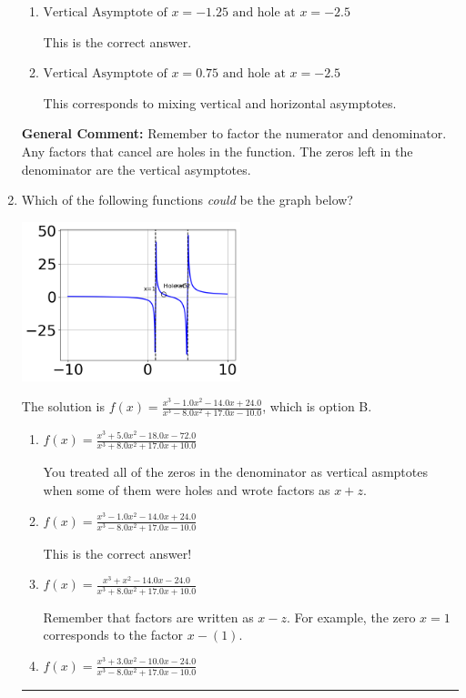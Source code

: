 \documentclass{extbook}[14pt]
\newcommand{\litem}[1]{\item #1

\rule{\textwidth}{0.4pt}}
\begin{document}
\begin{enumerate}
{\begin{enumerate}[label=\Alph*.]
This corresponds to considering where the denominator is equal to 0 as holes.
\item \( \text{Vertical Asymptote of } x = -1.25 \text{ and hole at } x = -2.5 \)

This is the correct answer.
\item \( \text{Vertical Asymptote of } x = 0.75 \text{ and hole at } x = -2.5 \)

This corresponds to mixing vertical and horizontal asymptotes.
\end{enumerate}

\textbf{General Comment:} Remember to factor the numerator and denominator. Any factors that cancel are holes in the function. The zeros left in the denominator are the vertical asymptotes.
}
\litem{
Which of the following functions \textit{could} be the graph below?

\begin{center}
    \includegraphics[width=0.5\textwidth]{../Figures/identifyGraphOfRationalFunctionCopyB.png}
\end{center}


The solution is \( f(x)=\frac{x^{3} -1.0 x^{2} -14.0 x + 24.0}{x^{3} -8.0 x^{2} +17.0 x -10.0} \), which is option B.\begin{enumerate}[label=\Alph*.]
\item \( f(x)=\frac{x^{3} +5.0 x^{2} -18.0 x -72.0}{x^{3} +8.0 x^{2} +17.0 x + 10.0} \)

You treated all of the zeros in the denominator as vertical asmptotes when some of them were holes and wrote factors as $x+z$.
\item \( f(x)=\frac{x^{3} -1.0 x^{2} -14.0 x + 24.0}{x^{3} -8.0 x^{2} +17.0 x -10.0} \)

This is the correct answer!
\item \( f(x)=\frac{x^{3} + x^{2} -14.0 x -24.0}{x^{3} +8.0 x^{2} +17.0 x + 10.0} \)

Remember that factors are written as $x-z$. For example, the zero $x=1$ corresponds to the factor $x-(1)$.
\item \( f(x)=\frac{x^{3} +3.0 x^{2} -10.0 x -24.0}{x^{3} -8.0 x^{2} +17.0 x -10.0} \)


\end{enumerate}}
\end{enumerate}
\end{document}
